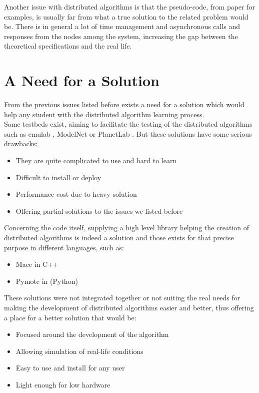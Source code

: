 \documentclass{eplmastersthesis}
\begin{document}
      Another issue with distributed algorithms is that the pseudo-code,
      from paper for examples, is usually far from what a true solution to the
      related problem would be. There is in general a lot of time management
      and asynchronous calls and responses from the nodes among the system,
      increasing the gap between the theoretical specifications and the real
      life.

    \section{A Need for a Solution}

      From the previous issues listed before exists a need for a solution
      which would help any student with the distributed algorithm learning
      process.\\
      Some testbeds exist, aiming to facilitate the testing of the
      distributed algorithms such as emulab \cite{Emulab}, ModelNet
      \cite{ModelNet} or PlanetLab \cite{PlanetLab}. But these solutions have
      some serious drawbacks:

      \begin{itemize}
        \item They are quite complicated to use and hard to learn
        \item Difficult to install or deploy
        \item Performance cost due to heavy solution
        \item Offering partial solutions to the issues we listed before
      \end{itemize}

      Concerning the code itself, supplying a high level library helping the
      creation of distributed algorithms is indeed a solution and those
      exists for that precise purpose in different languages, such as:

      \begin{itemize}
        \item Mace \cite{Mace} in C++
        \item Pymote \cite{Pymote} in (Python)
      \end{itemize}

      These solutions were not integrated together or not suiting the real needs
      for making the development of distributed algorithms easier and better,
      thus offering a place for a better solution that would be:

      \begin{itemize}
        \item Focused around the development of the algorithm
        \item Allowing simulation of real-life conditions
        \item Easy to use and install for any user
        \item Light enough for low hardware
      \end{itemize}
\end{document}
